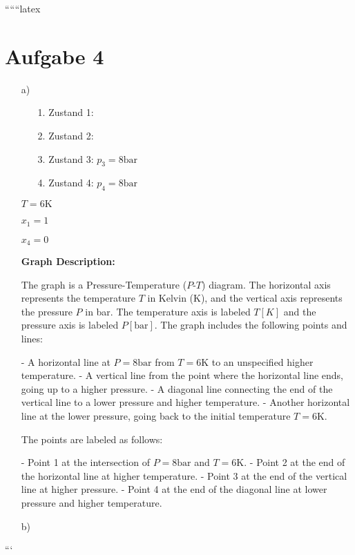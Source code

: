 
``````latex


\section*{Aufgabe 4}

\begin{itemize}
    \item[a)] 
    \begin{itemize}
        \item[1.] Zustand 1:
        \item[2.] Zustand 2:
        \item[3.] Zustand 3: \( p_3 = 8 \text{bar} \)
        \item[4.] Zustand 4: \( p_4 = 8 \text{bar} \)
    \end{itemize}
    
    \( T = 6 \text{K} \)
    
    \( x_1 = 1 \)
    
    \( x_4 = 0 \)
    
    \textbf{Graph Description:}
    
    The graph is a Pressure-Temperature (\( P \)-\( T \)) diagram. The horizontal axis represents the temperature \( T \) in Kelvin (K), and the vertical axis represents the pressure \( P \) in bar. The temperature axis is labeled \( T [K] \) and the pressure axis is labeled \( P [\text{bar}] \). The graph includes the following points and lines:
    
    - A horizontal line at \( P = 8 \text{bar} \) from \( T = 6 \text{K} \) to an unspecified higher temperature.
    - A vertical line from the point where the horizontal line ends, going up to a higher pressure.
    - A diagonal line connecting the end of the vertical line to a lower pressure and higher temperature.
    - Another horizontal line at the lower pressure, going back to the initial temperature \( T = 6 \text{K} \).
    
    The points are labeled as follows:
    
    - Point 1 at the intersection of \( P = 8 \text{bar} \) and \( T = 6 \text{K} \).
    - Point 2 at the end of the horizontal line at higher temperature.
    - Point 3 at the end of the vertical line at higher pressure.
    - Point 4 at the end of the diagonal line at lower pressure and higher temperature.
    
    \item[b)]
\end{itemize}

```